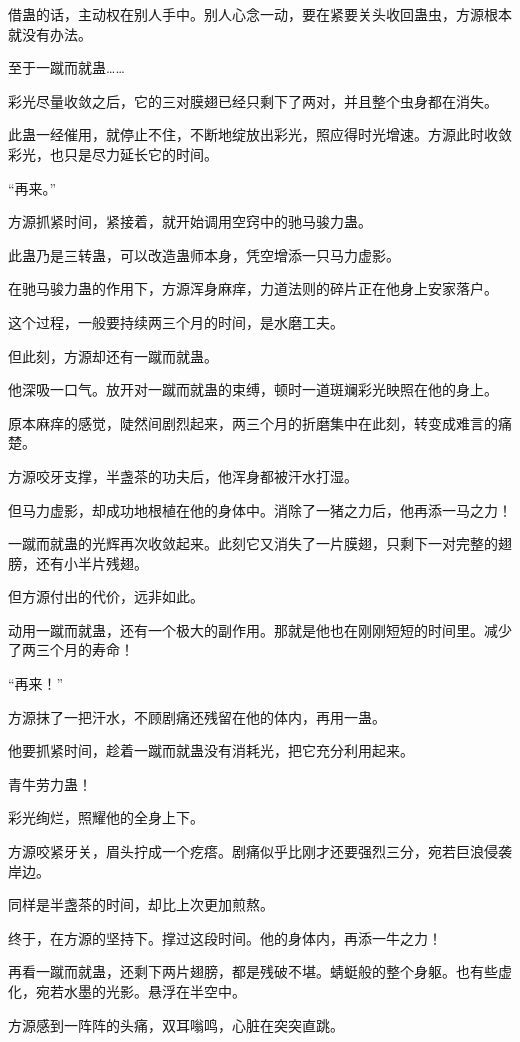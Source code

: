 \begin{this_body}
借蛊的话，主动权在别人手中。别人心念一动，要在紧要关头收回蛊虫，方源根本就没有办法。

至于一蹴而就蛊……

彩光尽量收敛之后，它的三对膜翅已经只剩下了两对，并且整个虫身都在消失。

此蛊一经催用，就停止不住，不断地绽放出彩光，照应得时光增速。方源此时收敛彩光，也只是尽力延长它的时间。

“再来。”

方源抓紧时间，紧接着，就开始调用空窍中的驰马骏力蛊。

此蛊乃是三转蛊，可以改造蛊师本身，凭空增添一只马力虚影。

在驰马骏力蛊的作用下，方源浑身麻痒，力道法则的碎片正在他身上安家落户。

这个过程，一般要持续两三个月的时间，是水磨工夫。

但此刻，方源却还有一蹴而就蛊。

他深吸一口气。放开对一蹴而就蛊的束缚，顿时一道斑斓彩光映照在他的身上。

原本麻痒的感觉，陡然间剧烈起来，两三个月的折磨集中在此刻，转变成难言的痛楚。

方源咬牙支撑，半盏茶的功夫后，他浑身都被汗水打湿。

但马力虚影，却成功地根植在他的身体中。消除了一猪之力后，他再添一马之力！

一蹴而就蛊的光辉再次收敛起来。此刻它又消失了一片膜翅，只剩下一对完整的翅膀，还有小半片残翅。

但方源付出的代价，远非如此。

动用一蹴而就蛊，还有一个极大的副作用。那就是他也在刚刚短短的时间里。减少了两三个月的寿命！

“再来！”

方源抹了一把汗水，不顾剧痛还残留在他的体内，再用一蛊。

他要抓紧时间，趁着一蹴而就蛊没有消耗光，把它充分利用起来。

青牛劳力蛊！

彩光绚烂，照耀他的全身上下。

方源咬紧牙关，眉头拧成一个疙瘩。剧痛似乎比刚才还要强烈三分，宛若巨浪侵袭岸边。

同样是半盏茶的时间，却比上次更加煎熬。

终于，在方源的坚持下。撑过这段时间。他的身体内，再添一牛之力！

再看一蹴而就蛊，还剩下两片翅膀，都是残破不堪。蜻蜓般的整个身躯。也有些虚化，宛若水墨的光影。悬浮在半空中。

方源感到一阵阵的头痛，双耳嗡鸣，心脏在突突直跳。


\end{this_body}
